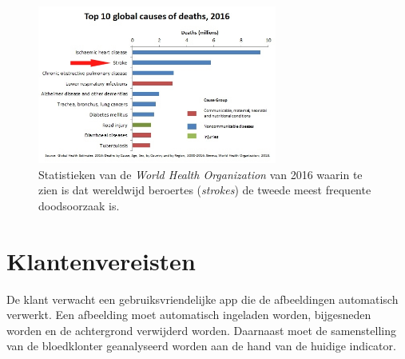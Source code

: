 \documentclass[a4paper,kulak]{kulakarticle}
\begin{document}
	\begin{figure}[H]
		\centering
		\includegraphics[width = 0.7\textwidth]{top10doodsoorzaken.png}
	
		\caption{Statistieken van de \textit{World Health Organization} van 2016 waarin te zien is dat wereldwijd beroertes (\textit{strokes}) de tweede meest frequente doodsoorzaak is.}
		\label{figuur doodsoorzaken}
	\end{figure}

\pagebreak
\newpage

\tableofcontents

\newpage

\section{Klantenvereisten}
De klant verwacht een gebruiksvriendelijke app die de afbeeldingen automatisch verwerkt. Een afbeelding moet automatisch ingeladen worden, bijgesneden worden en de achtergrond verwijderd worden. Daarnaast moet de samenstelling van de bloedklonter geanalyseerd worden aan de hand van de huidige indicator.
\end{document}
